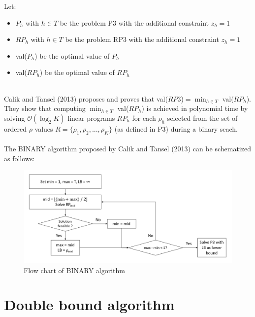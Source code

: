 Let:
\begin{itemize}
	\item $P_h$ with $h \in T$ be the problem P3 with the additional constraint $z_h = 1$
	\item $RP_h$ with $h \in T$ be the problem RP3 with the additional constraint $z_h = 1$
	\item val($P_h$) be the optimal value of $P_h$
	\item val($RP_h$) be the optimal value of $RP_h$
\end{itemize}\ \\
Calik and Tansel (2013) proposes and proves that val($RP3$)$ = \min_{h \in T}$ val($RP_h$). They show that computing $\min_{h \in T}$ val($RP_h$) is achieved in polynomial time by solving $\mathcal{O}\left( \log_2 K \right)$ linear programs $RP_h$ for each $\rho_h$ selected from the set of ordered $\rho$ values $R = \lbrace \rho_1, \rho_2, ..., \rho_K \rbrace$ (as defined in P3) during a binary seach.\\\\
The BINARY algorithm proposed by Calik and Tansel (2013) can be schematized as follows:
\begin{figure}[H]
	\begin{center}
		\includegraphics[width=\textwidth]{../imgs/BINARY.png}
		\caption{Flow chart of BINARY algorithm}
	\end{center}
\end{figure}

\section{Double bound algorithm}

